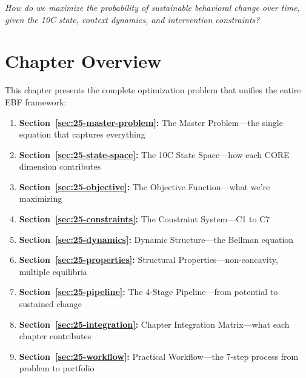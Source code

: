 \begin{tcolorbox}[colback=red!5!white,colframe=red!75!black,
    title=\textbf{Central Question}]
\begin{center}
\Large\textit{How do we maximize the probability of sustainable behavioral change over time, given the 10C state, context dynamics, and intervention constraints?}
\end{center}
\end{tcolorbox}

\section*{Chapter Overview}

This chapter presents the complete optimization problem that unifies the entire EBF framework:

\begin{enumerate}
    \item \textbf{Section~\ref{sec:25-master-problem}:} The Master Problem---the single equation that captures everything
    \item \textbf{Section~\ref{sec:25-state-space}:} The 10C State Space---how each CORE dimension contributes
    \item \textbf{Section~\ref{sec:25-objective}:} The Objective Function---what we're maximizing
    \item \textbf{Section~\ref{sec:25-constraints}:} The Constraint System---C1 to C7
    \item \textbf{Section~\ref{sec:25-dynamics}:} Dynamic Structure---the Bellman equation
    \item \textbf{Section~\ref{sec:25-properties}:} Structural Properties---non-concavity, multiple equilibria
    \item \textbf{Section~\ref{sec:25-pipeline}:} The 4-Stage Pipeline---from potential to sustained change
    \item \textbf{Section~\ref{sec:25-integration}:} Chapter Integration Matrix---what each chapter contributes
    \item \textbf{Section~\ref{sec:25-workflow}:} Practical Workflow---the 7-step process from problem to portfolio
\end{enumerate}



